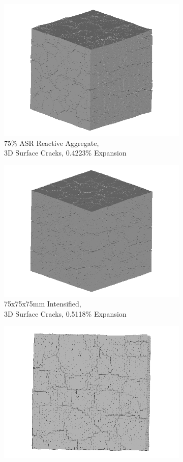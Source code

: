 \clearpage

\begin{figure}[ht]
\centering

    \begin{subfigure}{.5\textwidth}
      \centering
      \includegraphics[width=.8\linewidth]{Files/exp_3D/ASR/A30P75_3_3d.png}
      \caption{75\% ASR Reactive Aggregate, \\3D Surface Cracks, 0.4223\% Expansion}
    \end{subfigure}%
    \begin{subfigure}{.5\textwidth}
      \centering
      \includegraphics[width=.8\linewidth]{Files/exp_3D/DEF/A30X-5C_3_3d.png}
      \caption{75x75x75mm Intensified, \\ 3D Surface Cracks, 0.5118\% Expansion}
    \end{subfigure}
    \begin{subfigure}{.5\textwidth}
      \centering
      \includegraphics[width=.8\linewidth]{Files/exp_3D/ASR/A30P75_3_3ds.png}

\end{subfigure}
\end{figure}
